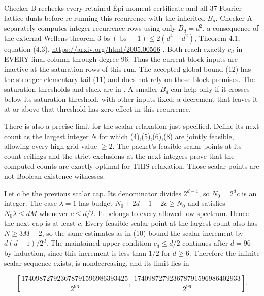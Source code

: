 \documentclass[11pt]{article}
\theoremstyle{remark}
\theoremstyle{correctionstyle}
\begin{document}
\leavevmode\label{src-p089}Checker B rechecks every retained Épi moment certificate and all 37
Fourier-lattice duals before re-running this recurrence with the inherited
$B_d$. Checker A separately computes integer recurrence rows using only
$B_d=d^2$, a consequence of the external Wellens theorem
$3\operatorname{bs}(\operatorname{bs}-1)\le2(d^4-d^2)$, Theorem 4.1, equation (4.3),
\url{https://arxiv.org/html/2005.00566} . Both reach exactly $c_d$ in EVERY final
column through degree 96. Thus the current block inputs are inactive at
the saturation rows of this run. The accepted global bound (12) has the
stronger elementary tail (11) and does not rely on those block premises.
The saturation thresholds and slack are in . A smaller $B_d$
can help only if it crosses below its saturation threshold, with other
inputs fixed; a decrement that leaves it at or above that threshold has
zero effect in this recurrence.\label{src-end-p089}\par

\leavevmode\label{src-p090}There is also a precise limit for the scalar relaxation just specified.
Define its next count as the largest integer $N$ for which (4),(5),(6),(8)
are jointly feasible, allowing every high grid value $\ge2$. The packet's
feasible scalar points at its count ceilings and the strict exclusions at
the next integers prove that the computed counts are exactly optimal for
THIS relaxation. Those scalar points are not Boolean existence witnesses.\label{src-end-p090}\par

\leavevmode\label{src-p091}Let $c$ be the previous scalar cap. Its denominator divides $2^{d-1}$, so
$N_0=2^dc$ is an integer. The case $\lambda=1$ has budget
$N_0+2d-1-2c\ge N_0$ and satisfies $N_0\lambda\le dM$ whenever $c\le d/2$.
It belongs to every allowed low spectrum. Hence the next cap is at least $c$.
Every feasible scalar point at the largest count also has $N\ge3M-2$, so the
same estimates as in (10) bound the scalar increment by $d(d-1)/2^d$.
The maintained upper condition $c_d\le d/2$ continues after $d=96$ by induction,
since this increment is less than $1/2$ for $d\ge6$. Therefore the infinite
scalar sequence exists, is nondecreasing, and its limit lies in\label{src-end-p091}\par

\begin{equation}
\left[\frac{174098727923678791596986393425}{2^{96}},\ \frac{174098727923678791596986402933}{2^{96}}\right].\tag{13}
\label{src-p092}
\end{equation}
\end{document}
